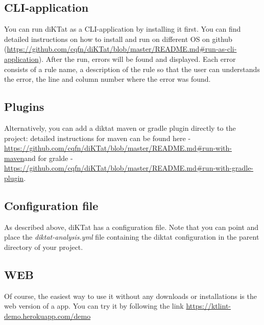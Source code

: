 \subsection{CLI-application}
\par You can run diKTat as a CLI-application by installing it first. You can find detailed instructions on how to install and run on different OS on github (\url{https://github.com/cqfn/diKTat/blob/master/README.md#run-as-cli-application}). After the run, errors will be found and displayed. Each error consists of a rule name, a description of the rule so that the user can understands the error, the line and column number where the error was found.\\
\subsection{Plugins}
\par Alternatively, you can add a diktat maven or gradle plugin directly to the project: detailed instructions for maven can be found here - \url{https://github.com/cqfn/diKTat/blob/master/README.md#run-with-maven}and for gralde - \url{https://github.com/cqfn/diKTat/blob/master/README.md#run-with-gradle-plugin}.\\
\subsection{Configuration file}
\par As described above, diKTat has a configuration file. Note that you can point and place the \textsl{diktat-analysis.yml} file containing the diktat configuration in the parent directory of your project.
\subsection{WEB}
\par Of course, the easiest way to use it without any downloads or installations is the web version of a app. You can try it by following the link \url{https://ktlint-demo.herokuapp.com/demo}

